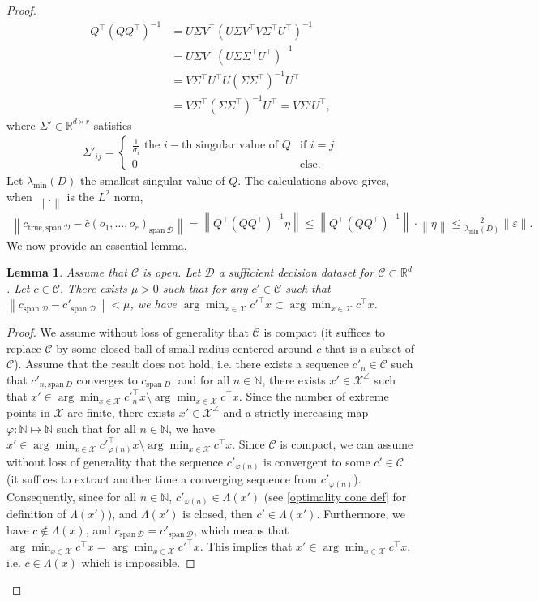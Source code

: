 \documentclass[11pt]{article}
\theoremstyle{plain}
\newtheorem{lemma}{Lemma}
\theoremstyle{definition}
\newcommand{\R}[0]{\mathbb R}
\newcommand{\Vect}{\mathrm{span}~}
\newcommand{\norm}[1]{\left\lVert#1\right\rVert}
\newcommand{\sufficient}{sufficient decision dataset}
\newcommand{\cX}{\mathcal{X}}
\newcommand{\cC}{\mathcal{C}}
\newcommand{\cD}{\mathcal{D}}
\begin{document}
\begin{proof}
    \begin{align*}
        Q^\top (QQ^\top)^{-1}&=U\Sigma V^\top (U\Sigma V^\top V \Sigma^\top U^\top)^{-1}\\
        &=U\Sigma V^\top (U\Sigma \Sigma^\top U^\top)^{-1}\\
        &=V\Sigma^\top  U^\top U(\Sigma \Sigma^\top)^{-1} U^\top\\
        &=V\Sigma^\top (\Sigma \Sigma^\top)^{-1} U^\top=V\Sigma'U^\top,
    \end{align*}
    where $\Sigma'\in \R^{d\times r}$ satisfies
    \begin{align*}
        \Sigma'_{ij}=\begin{cases}\text{$\frac{1}{\sigma_i}$ the $i-$th singular value of $Q$} & \text{if }i=j\\ 0 &\text{else.}\end{cases}
    \end{align*}
    Let $\lambda_{\text{min}}(D)$ the smallest singular value of $Q$. The calculations above gives, when $\norm{.}$ is the $L^2$ norm,
    \begin{align*}
        \norm{c_{\text{true},\Vect \cD}-\hat{c}(o_1,\dots,o_r)_{\Vect \cD}}=\norm{Q^\top (QQ^\top)^{-1}\eta}\leq \norm{Q^\top (QQ^\top)^{-1}}\cdot \norm{\eta}\leq \frac{2}{\lambda_{\text{min}}(D)}\norm{\varepsilon}.
    \end{align*}
    We now provide an essential lemma.
\begin{lemma}
        Assume that $\cC$ is open. Let $\cD$ a \sufficient{} for $\cC\subset \R^d$. Let $c\in \cC$. There exists $\mu>0$ such that for any $c'\in \cC$ such that $\norm{c_{\Vect \cD}-c'_{\Vect \cD}}<\mu$, we have $\arg\min_{x\in \cX}c'^\top x \subset \arg\min_{x\in \cX}c^\top x$.
    \end{lemma}
    \begin{proof}
        We assume without loss of generality that $\cC$ is compact (it suffices to replace $\cC$ by some closed ball of small radius centered around $c$ that is a subset of $\cC$). Assume that the result does not hold, i.e. there exists a sequence $c'_n\in \cC$ such that $c'_{n,\Vect D}$ converges to $c_{\Vect D}$, and for all $n\in \mathbb N$, there exists $x'\in \cX^\angle$ such that $x'\in \arg\min_{x\in \cX}c'^\top_n x \setminus \arg\min_{x\in \cX}c^\top x $. Since the number of extreme points in $\cX$ are finite, there exists $x'\in \cX^\angle$ and a strictly increasing map $\varphi:\mathbb N \longmapsto \mathbb N$ such that for all $n\in \mathbb N$, we have $x'\in \arg\min_{x\in \cX}c'^\top_{\varphi(n)} x \setminus \arg\min_{x\in \cX}c^\top x $. Since $\cC$ is compact, we can assume without loss of generality that the sequence $c'_{\varphi(n)}$ is convergent to some $c'\in \cC$ (it suffices to extract another time a converging sequence from $c'_{\varphi(n)}$). Consequently, since for all $n\in \mathbb N$, $c'_{\varphi(n)}\in \Lambda(x')$ (see \cref{optimality cone def} for definition of $\Lambda(x')$), and $\Lambda(x')$ is closed, then $c'\in \Lambda(x')$. Furthermore, we have $c\not\in \Lambda(x)$, and $c_{\Vect \cD}=c'_{\Vect \cD}$, which means that $\arg\min_{x\in \cX}c^\top x=\arg\min_{x\in \cX}c'^\top x$. This implies that $x'\in \arg\min_{x\in \cX}c^\top x$, i.e. $c\in \Lambda(x)$ which is impossible.

\end{proof}
\end{proof}
\end{document}
